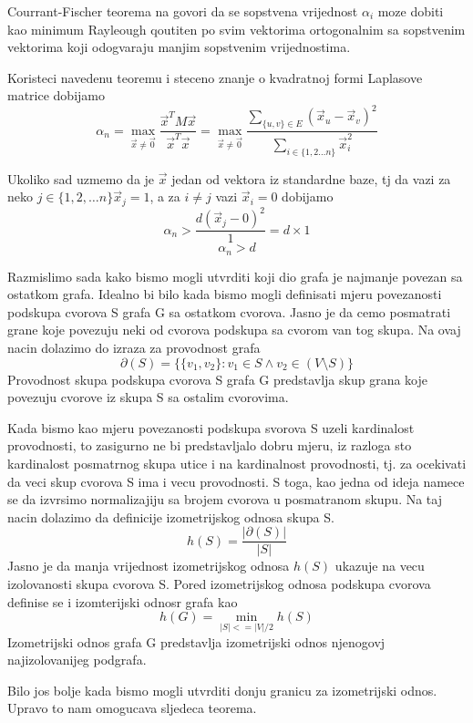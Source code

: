 \documentclass[11pt]{article}
\begin{document}
    Courrant-Fischer teorema na govori da se sopstvena vrijednost $\alpha_i$ moze dobiti kao minimum Rayleough qoutiten po svim vektorima 
    ortogonalnim sa sopstvenim vektorima koji odogvaraju manjim sopstvenim vrijednostima. 

    Koristeci navedenu teoremu i steceno znanje o kvadratnoj formi Laplasove matrice dobijamo
    \[
        \alpha_n = \max_{\vec{x} \neq \vec{0}} \frac{\vec{x}^T M \vec{x}}{\vec{x}^T\vec{x}} = \max_{\vec{x} \neq \vec{0}} \frac{ \sum_{\{u,v\} \in E} (\vec{x}_u - \vec{x}_v)^2 }{ \sum_{i \in \{1,2 \dots n\}} \vec{x}_i^2}
    \]
        
    Ukoliko sad uzmemo da je $\vec{x}$ jedan od vektora iz standardne baze, tj da vazi za neko $j \in \{1,2, \dots n\} \vec{x}_j = 1$, a za $i \neq j$ vazi $\vec{x}_i = 0$ dobijamo
    \[
        \alpha_n > \frac{ d (\vec{x}_j - 0)^2 }{1} = d \times 1  
    \]
    \[
        \alpha_n > d  
    \]

    Razmislimo sada kako bismo mogli utvrditi koji dio grafa je najmanje povezan sa ostatkom grafa. Idealno bi bilo kada bismo mogli definisati mjeru povezanosti podskupa cvorova S grafa G sa ostatkom cvorova.
    Jasno je da cemo posmatrati grane koje povezuju neki od cvorova podskupa sa cvorom van tog skupa. Na ovaj nacin dolazimo do izraza za provodnost grafa
    \[ \partial(S) = \{ \{v_1,v_2\}: v_1 \in S \land v_2 \in (V \setminus S)\} \]
    Provodnost skupa podskupa cvorova S grafa G predstavlja skup grana koje povezuju cvorove iz skupa S sa ostalim cvorovima.


    Kada bismo kao mjeru povezanosti podskupa svorova S uzeli kardinalost provodnosti, to zasigurno ne bi predstavljalo dobru mjeru, iz razloga sto kardinalost
    posmatrnog skupa utice i na kardinalnost provodnosti, tj. za ocekivati da veci skup cvorova S ima i vecu provodnosti. S toga, kao jedna od ideja namece se da izvrsimo normalizajiju sa brojem 
    cvorova u posmatranom skupu. Na taj nacin dolazimo da definicije izometrijskog odnosa skupa S.
    \[
        h(S) = \frac{|\partial(S)|}{|S|}
    \]
    Jasno je da manja vrijednost izometrijskog odnosa $h(S)$ ukazuje na vecu izolovanosti skupa cvorova S.
    Pored izometrijskog odnosa podskupa cvorova definise se i izomterijski odnosr grafa kao
    \[
         h(G) = \min_{|S| <= |V| / 2} h(S)
    \]
    Izometrijski odnos grafa G predstavlja izometrijski odnos njenogovj najizolovanijeg podgrafa.
    
    Bilo jos bolje kada bismo mogli utvrditi donju granicu za izometrijski odnos. Upravo to nam omogucava sljedeca teorema.
\end{document}
